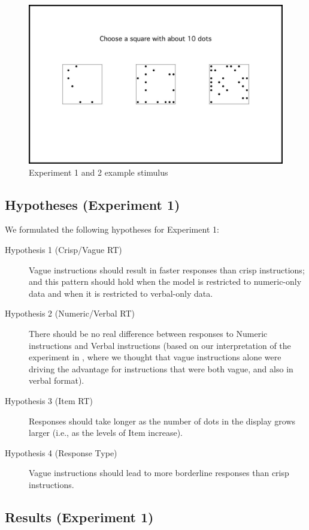 \begin{figure}[htbp]
\centering
\includegraphics[width=.75\textwidth]{figures/Ce1-example-screenshot-border}
\caption{Experiment 1 and 2 example stimulus}
\label{Experiment1and2examplestimulus}
\end{figure}

\subsection{Hypotheses (Experiment 1)} 

We formulated the following hypotheses for Experiment 1:

\begin{description}
	\item [Hypothesis 1 (Crisp/Vague RT)] Vague instructions should result in faster responses than crisp instructions; and this pattern should hold when the model is restricted to numeric-only data and when it is restricted to verbal-only data.
	\item [Hypothesis 2 (Numeric/Verbal RT)] There should be no real difference between responses to Numeric instructions and Verbal instructions (based on our interpretation of the experiment in \citet{green2013utility}, where we thought that vague instructions alone were driving the advantage for instructions that were both vague, and also in verbal format).
	\item [Hypothesis 3 (Item RT)] Responses should take longer as the number of dots in the display grows larger (i.e., as the levels of Item increase).
	\item [Hypothesis 4 (Response Type)] Vague instructions should lead to more borderline responses than crisp instructions.
\end{description}

\subsection{Results (Experiment 1)} 

